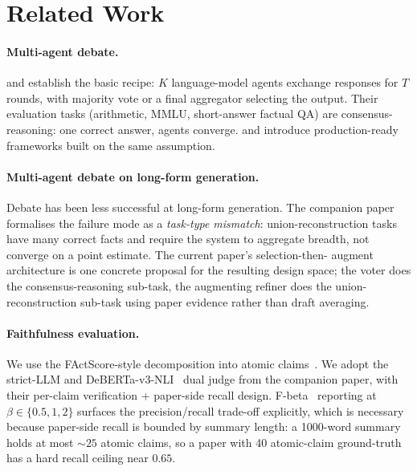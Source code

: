 \documentclass[11pt,a4paper]{article}
\begin{document}
\section{Related Work}
\label{sec:related}

\paragraph{Multi-agent debate.}
\citet{du2023improving} and \citet{liang2023encouraging} establish the
basic recipe: $K$ language-model agents exchange responses for $T$
rounds, with majority vote or a final aggregator selecting the
output. Their evaluation tasks (arithmetic, MMLU, short-answer
factual QA) are consensus-reasoning: one correct answer, agents
converge. \citet{wu2023autogen} and \citet{madaan2023selfrefine}
introduce production-ready frameworks built on the same assumption.

\paragraph{Multi-agent debate on long-form generation.}
Debate has been less successful at long-form generation. The
companion paper~\cite{sun2026refined} formalises the failure mode as
a \emph{task-type mismatch}: union-reconstruction tasks have many
correct facts and require the system to aggregate breadth, not
converge on a point estimate. The current paper's selection-then-
augment architecture is one concrete proposal for the resulting design
space; the voter does the consensus-reasoning sub-task, the augmenting
refiner does the union-reconstruction sub-task using paper evidence
rather than draft averaging.

\paragraph{Faithfulness evaluation.}
We use the FActScore-style decomposition into atomic
claims~\cite{min2023factscore}. We adopt the strict-LLM and
DeBERTa-v3-NLI~\cite{he2021debertav3} dual judge from the companion
paper, with their per-claim verification + paper-side recall design.
F-beta~\cite{vanrijsbergen1979information} reporting at
$\beta\in\{0.5,1,2\}$ surfaces the precision/recall trade-off
explicitly, which is necessary because paper-side recall is bounded
by summary length: a 1000-word summary holds at most $\sim 25$
atomic claims, so a paper with 40 atomic-claim ground-truth has a
hard recall ceiling near $0.65$.
\end{document}
